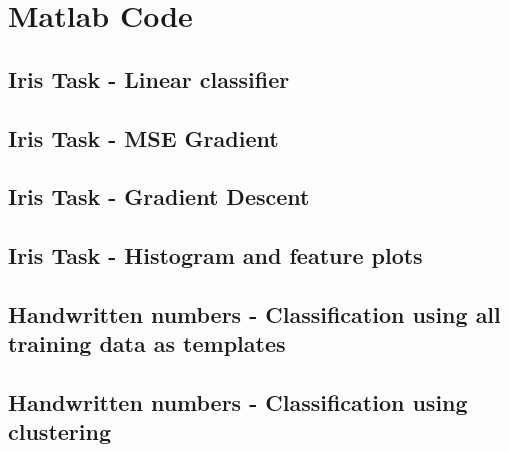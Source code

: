 \appendix


\section{Matlab Code}\label{sec:matlab}

\subsection{Iris Task - Linear classifier}

\newpage

\subsection{Iris Task - MSE Gradient}

\hfill

\subsection{Iris Task - Gradient Descent}

\newpage

\subsection{Iris Task - Histogram and feature plots}

\newpage


\subsection{Handwritten numbers - Classification using all training data as templates}\label{lst:nums_classify_code} 
\newpage

\subsection{Handwritten numbers - Classification using clustering}\label{lst:nums_cluster_code} 
\newpage
